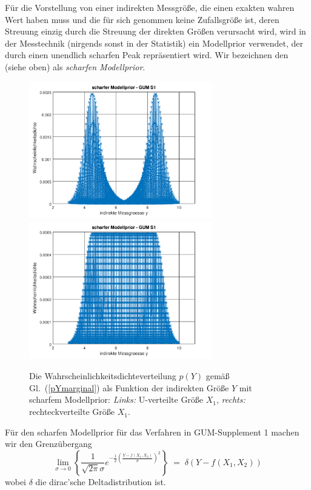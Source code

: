 Für die Vorstellung von einer indirekten Messgröße, die einen exakten wahren Wert haben muss und
die für sich genommen keine Zufallsgröße ist, deren Streuung einzig durch die Streuung der direkten
Größen verursacht wird, wird in der Messtechnik (nirgends sonst in der Statistik) ein
Modellprior verwendet, der durch einen unendlich scharfen Peak repräsentiert wird.
Wir bezeichnen den (siehe oben) als \textsl{scharfen Modellprior}.

\begin{figure}
	\begin{center}
		\includegraphics[width=80mm]{11_vorlesung_GUMS1/media/indirekte_ysorted_GUMS1.png}
		\hspace{2mm}
		\includegraphics[width=80mm]{11_vorlesung_GUMS1/media/indirekte_ysorted_GUMS1_box.png}
		\caption{Die Wahrscheinlichkeitsdichteverteilung $p(Y)$ gemäß Gl.~(\ref{pYmarginal}) als Funktion der
			indirekten Größe $Y$ mit scharfem Modellprior:
			\textsl{Links:} U-verteilte Größe $X_1$,
			\textsl{rechts:} rechteckverteilte Größe $X_1$.}
		\label{pdfYscharf}
	\end{center}
\end{figure}

Für den scharfen Modellprior für das Verfahren in GUM-Supplement 1 machen wir den Grenzübergang
\begin{equation}
\lim_{\sigma \rightarrow 0} \left\{
\frac{1}{\sqrt{2\pi} \sigma} e^{-\frac{1}{2}\left(\frac{Y - f(X_1, X_2)}{\sigma}\right)^2}
\right\} \; = \; \delta(Y - f(X_1, X_2))
\end{equation}
wobei $\delta$ die dirac'sche Deltadistribution ist.

